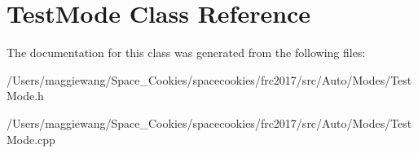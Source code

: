 \hypertarget{class_test_mode}{}\section{Test\+Mode Class Reference}
\label{class_test_mode}


The documentation for this class was generated from the following files\+:\begin{DoxyCompactItemize}
\item 
/\+Users/maggiewang/\+Space\+\_\+\+Cookies/spacecookies/frc2017/src/\+Auto/\+Modes/Test\+Mode.\+h\item 
/\+Users/maggiewang/\+Space\+\_\+\+Cookies/spacecookies/frc2017/src/\+Auto/\+Modes/Test\+Mode.\+cpp\end{DoxyCompactItemize}
